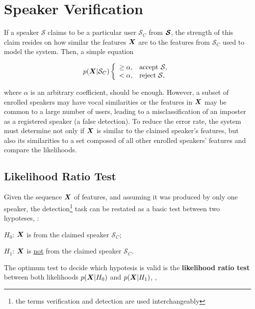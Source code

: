 \section{Speaker Verification}
\label{sec:speaker-verification}

If a speaker $\mathcal{S}$ claims to be a particular user $\mathcal{S}_{C}$ from $\boldsymbol{\mathcal{S}}$, the strength of this claim resides on how similar the features $\boldsymbol{X}$ are to the features from $\mathcal{S}_{C}$ used to model the system. Then, a simple equation

\begin{equation}
    \postpdf{\boldsymbol{X}}{\mathcal{S}_{C}} \verifytestB{\alpha}{\mathcal{S}}
    \label{eq:decision_speaker_verification}
\end{equation}

\noindent where $\alpha$ is an arbitrary coefficient, should be enough. However, a subset of enrolled speakers may have vocal similarities or the features in $\boldsymbol{X}$ may be common to a large number of users, leading to a misclassification of an imposter as a registered speaker (a false detection). To reduce the error rate, the system must determine not only if $\boldsymbol{X}$ is similar to the claimed speaker's features, but also its similarities to a set composed of all other enrolled speakers' features and compare the likelihoods.

\subsection{Likelihood Ratio Test}

Given the sequence $\boldsymbol{X}$ of features, and assuming it was produced by only one speaker, the detection\footnote{the terms verification and detection are used interchangeably} task can be restated as a basic test between two hypoteses, :

\begin{description}\itemsep0pt
    \item $H_0$: $\boldsymbol{X}$ is from the claimed speaker $\mathcal{S}_{C}$;
    \item $H_1$: $\boldsymbol{X}$ is \underline{not} from the claimed speaker $\mathcal{S}_{C}$.
\end{description}

\noindent The optimum test to decide which hypotesis is valid is the \textbf{likelihood ratio test} between both likelihoods $p(\boldsymbol{X}|H_0)$ and $p(\boldsymbol{X}|H_1)$, ,

